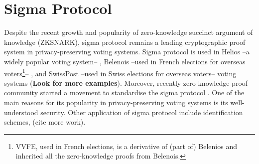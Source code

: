 \documentclass[conference,compsoc]{IEEEtran}
\begin{document}
\section{Sigma Protocol}
Despite the recent growth and popularity of zero-knowledge succinct 
argument of knowledge (ZKSNARK), sigma protocol remains a
leading cryptographic proof system in privacy-preserving voting systems. 
Sigma protocol is used in Helios --a widely popular voting system-- \cite{adida2008helios}, 
Belenois --used in French elections for overseas 
voters\footnote{VVFE, used in French elections, is a derivative of (part of) Belenios and 
inherited all the zero-knowledge proofs from Belenois.}-- \cite{cortier2023french}, and 
SwissPost --used in Swiss elections for overseas voters-- voting 
systems \cite{10.1007/978-3-031-15911-4_4} (\textbf{Look for more examples}). 
Moreover, recently zero-knowledge proof community started a movement to standardise
the sigma protocol \cite{ZKProof}.
One of the main reasons for its popularity in privacy-preserving voting systems is its
well-understood security.  Other application of sigma protocol 
include identification schemes, (cite more work). 
\end{document}
